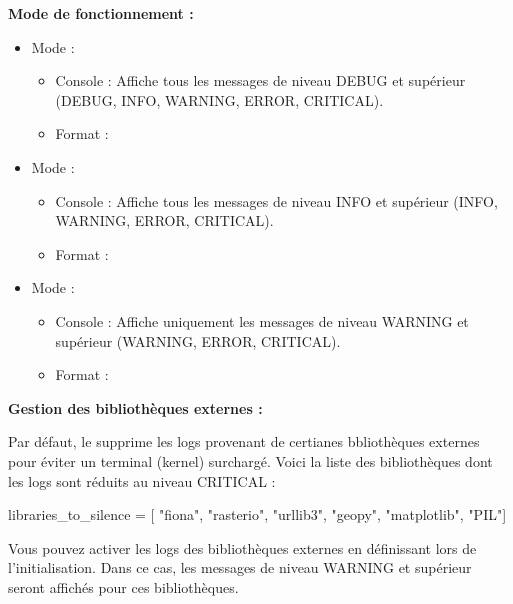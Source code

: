 \noindent\textbf{Mode de fonctionnement :}
\begin{itemize}[leftmargin=1.5cm]
    \item Mode  :
    \begin{itemize}
        \item Console : Affiche tous les messages de niveau DEBUG et supérieur (DEBUG, INFO, WARNING, ERROR, CRITICAL).
        \item Format : 
    \end{itemize}
    \item Mode  :
    \begin{itemize}
        \item Console : Affiche tous les messages de niveau INFO et supérieur (INFO, WARNING, ERROR, CRITICAL).
        \item Format : 
    \end{itemize}
    \item Mode  :
    \begin{itemize}
        \item Console : Affiche uniquement les messages de niveau WARNING et supérieur (WARNING, ERROR, CRITICAL).
        \item Format : 
    \end{itemize}
\end{itemize}

\vspace{1em}

\noindent\textbf{Gestion des bibliothèques externes :}

Par défaut, le  supprime les logs provenant de certianes bbliothèques externes pour éviter un terminal (kernel) surchargé. Voici la liste des bibliothèques dont les logs sont réduits au niveau CRITICAL :

\begin{pythoncode}[]
    libraries_to_silence = [
        "fiona", 
        "rasterio", 
        "urllib3", 
        "geopy", 
        "matplotlib", 
        "PIL"]
\end{pythoncode}

Vous pouvez activer les logs des bibliothèques externes en définissant  lors de l'initialisation. Dans ce cas, les messages de niveau WARNING et supérieur seront affichés pour ces bibliothèques.

